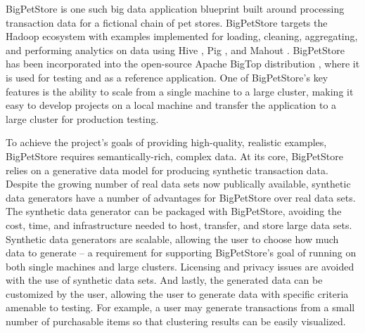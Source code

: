 \documentclass[conference]{IEEEtran}
\begin{document}
BigPetStore is one such big data application blueprint built around processing transaction data for a fictional chain of pet stores.  BigPetStore targets the Hadoop \cite{Hadoop} ecosystem with examples implemented for loading, cleaning, aggregating, and performing analytics on data using Hive \cite{Thusoo2010}, Pig \cite{Olston2008,Gates2009}, and Mahout \cite{Mahout}. BigPetStore has been incorporated into the open-source Apache BigTop distribution \cite{BigTop}, where it is used for testing and as a reference application. One of BigPetStore's key features is the ability to scale from a single machine to a large cluster, making it easy to develop projects on a local machine and transfer the application to a large cluster for production testing.

To achieve the project's goals of providing high-quality, realistic examples, BigPetStore requires semantically-rich, complex data. At its core, BigPetStore relies on a generative data model for producing synthetic transaction data. Despite the growing number of real data sets now publically available, synthetic data generators have a number of advantages for BigPetStore over real data sets. The synthetic data generator can be packaged with BigPetStore, avoiding the cost, time, and infrastructure needed to host, transfer, and store large data sets. Synthetic data generators are scalable, allowing the user to choose how much data to generate -- a requirement for supporting BigPetStore's goal of running on both single machines and large clusters.  Licensing and privacy issues are avoided with the use of synthetic data sets. And lastly, the generated data can be customized by the user, allowing the user to generate data with specific criteria amenable to testing.  For example, a user may generate transactions from a small number of purchasable items so that clustering results can be easily visualized.

\end{document}
